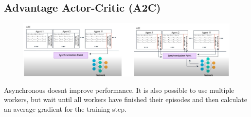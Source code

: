 \subsection{Advantage Actor-Critic (A2C)}
\begin{figure}[h!]
    \includegraphics[width = \columnwidth]{
        figures/DeepReinforcementLearning3/A2C.png
    }
\end{figure}
Asynchronous doesnt improve performance.
It is also possible to use multiple workers, but wait until all workers have finished their episodes and then calculate an average gradient for the training step.